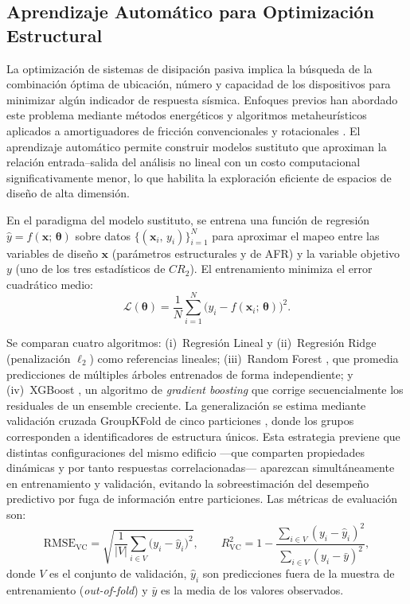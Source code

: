 \documentclass[preprint,12pt,authoryear]{elsarticle}
\newcommand{\RMSE}{\mathrm{RMSE_{VC}}}       %
\newcommand{\Rsq}{R^{2}_{\mathrm{VC}}}
\begin{document}
\subsection{Aprendizaje Automático para Optimización Estructural}
\label{sec:theory:ml}

La optimización de sistemas de disipación pasiva implica la búsqueda de la
combinación óptima de ubicación, número y capacidad de los dispositivos para
minimizar algún indicador de respuesta sísmica. Enfoques previos han abordado
este problema mediante métodos energéticos y algoritmos metaheurísticos aplicados
a amortiguadores de fricción convencionales y rotacionales
\citep{moreschi_design_2003, moghaddam_optimal_2022, ontiveros-perez_reliability-based_2019}.
El aprendizaje automático permite construir modelos sustituto que aproximan la
relación entrada--salida del análisis no lineal con un costo computacional
significativamente menor, lo que habilita la exploración eficiente de espacios
de diseño de alta dimensión.

En el paradigma del modelo sustituto, se entrena una función de regresión
$\hat{y} = f(\bm{x};\,\bm{\theta})$ sobre datos $\{(\bm{x}_i,\,y_i)\}_{i=1}^{N}$
para aproximar el mapeo entre las variables de diseño $\bm{x}$ (parámetros
estructurales y de AFR) y la variable objetivo $y$ (uno de los tres estadísticos
de $CR_2$). El entrenamiento minimiza el error cuadrático medio:
\begin{equation}
    \mathcal{L}(\bm{\theta}) = \frac{1}{N}\sum_{i=1}^{N}
    \bigl(y_i - f(\bm{x}_i;\,\bm{\theta})\bigr)^2.
    \label{eq:mse}
\end{equation}

Se comparan cuatro algoritmos: (i)~Regresión Lineal y (ii)~Regresión Ridge
(penalización $\ell_2$) como referencias lineales; (iii)~Random Forest
\citep{Breiman2001}, que promedia predicciones de múltiples árboles entrenados
de forma independiente; y (iv)~XGBoost \citep{Chen2016}, un algoritmo de
\textit{gradient boosting} que corrige secuencialmente los residuales de un
ensemble creciente. La generalización se estima mediante validación cruzada
GroupKFold de cinco particiones \citep{Kazemi2022}, donde los grupos corresponden
a identificadores de estructura únicos. Esta estrategia previene que distintas
configuraciones del mismo edificio ---que comparten propiedades dinámicas y por
tanto respuestas correlacionadas--- aparezcan simultáneamente en entrenamiento
y validación, evitando la sobreestimación del desempeño predictivo por fuga
de información entre particiones. Las métricas de evaluación son:
\begin{equation}
    \RMSE = \sqrt{\frac{1}{|V|}\sum_{i \in V}\bigl(y_i - \hat{y}_i\bigr)^2},
    \qquad
    \Rsq  = 1 - \frac{\sum_{i \in V}(y_i - \hat{y}_i)^2}
                      {\sum_{i \in V}(y_i - \bar{y})^2},
    \label{eq:metrics}
\end{equation}
donde $V$ es el conjunto de validación, $\hat{y}_i$ son predicciones fuera de la
muestra de entrenamiento (\textit{out-of-fold}) y $\bar{y}$ es la media de los
valores observados.
\end{document}
